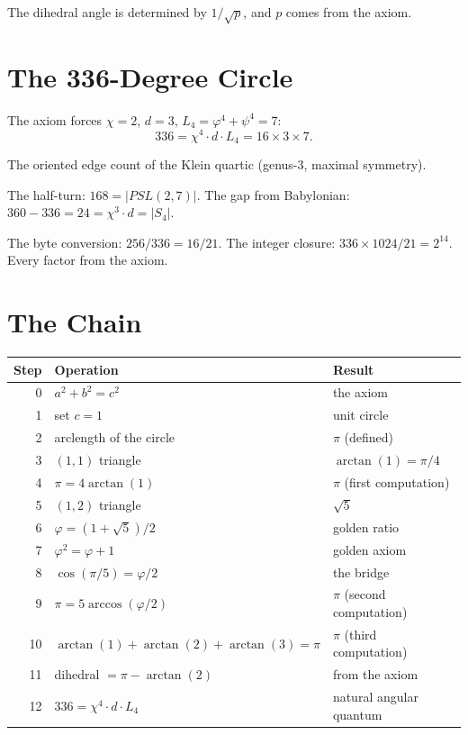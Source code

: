 \documentclass[11pt,a4paper]{article}
\theoremstyle{plain}
\theoremstyle{definition}
\newcommand{\vp}{\varphi}
\begin{document}
The dihedral angle is determined by $1/\sqrt{p}$, and $p$ comes from the axiom.

\section{The 336-Degree Circle}

The axiom forces $\chi = 2$, $d = 3$, $L_4 = \vp^4 + \psi^4 = 7$:
\begin{equation}
  336 = \chi^4 \cdot d \cdot L_4 = 16 \times 3 \times 7.
\end{equation}

The oriented edge count of the Klein quartic (genus-3, maximal symmetry).

The half-turn: $168 = |PSL(2,7)|$. The gap from Babylonian:
$360 - 336 = 24 = \chi^3 \cdot d = |S_4|$.

The byte conversion: $256/336 = 16/21$. The integer closure:
$336 \times 1024/21 = 2^{14}$. Every factor from the axiom.

\section{The Chain}

\begin{center}
\begin{tabular}{rll}
\toprule
Step & Operation & Result \\
\midrule
0 & $a^2 + b^2 = c^2$ & the axiom \\
1 & set $c = 1$ & unit circle \\
2 & arclength of the circle & $\pi$ (defined) \\
3 & $(1,1)$ triangle & $\arctan(1) = \pi/4$ \\
4 & $\pi = 4\arctan(1)$ & $\pi$ (first computation) \\
5 & $(1,2)$ triangle & $\sqrt{5}$ \\
6 & $\vp = (1+\sqrt{5})/2$ & golden ratio \\
7 & $\vp^2 = \vp + 1$ & golden axiom \\
8 & $\cos(\pi/5) = \vp/2$ & the bridge \\
9 & $\pi = 5\arccos(\vp/2)$ & $\pi$ (second computation) \\
10 & $\arctan(1)+\arctan(2)+\arctan(3)=\pi$ & $\pi$ (third computation) \\
11 & dihedral $= \pi - \arctan(2)$ & from the axiom \\
12 & $336 = \chi^4 \cdot d \cdot L_4$ & natural angular quantum \\
\bottomrule
\end{tabular}
\end{center}
\end{document}
